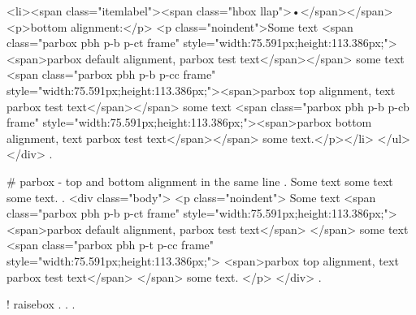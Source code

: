 <li><span class="itemlabel"><span class="hbox llap">•</span></span>
<p>bottom alignment:</p>
<p class="noindent">Some text <span class="parbox pbh p-b p-ct frame" style="width:75.591px;height:113.386px;"><span>parbox default alignment, parbox test text</span></span> some text <span class="parbox pbh p-b p-cc frame" style="width:75.591px;height:113.386px;"><span>parbox top alignment, text parbox test text</span></span> some text <span class="parbox pbh p-b p-cb frame" style="width:75.591px;height:113.386px;"><span>parbox bottom alignment, text parbox test text</span></span> some text.</p></li>
</ul>
</div>
.


#
parbox - top and bottom alignment in the same line
.
\noindent
Some text
some text
some text.
.
<div class="body">
<p class="noindent">
Some text <span class="parbox pbh p-b p-ct frame" style="width:75.591px;height:113.386px;">
<span>parbox default alignment, parbox test text</span>
</span> some text <span class="parbox pbh p-t p-cc frame" style="width:75.591px;height:113.386px;">
<span>parbox top alignment, text parbox test text</span>
</span> some text.
</p>
</div>
.


!
raisebox
.
.
.

